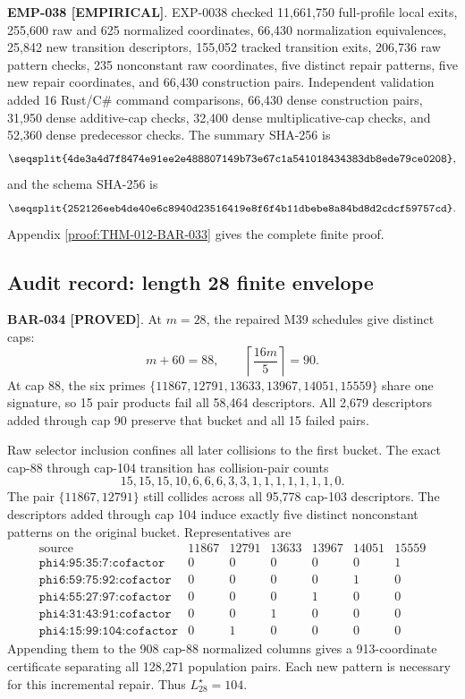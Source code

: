 \documentclass[11pt]{article}
\newcommand{\claimstatus}[2]{\textbf{#1 [#2]}}
\begin{document}
\claimstatus{EMP-038}{EMPIRICAL}. EXP-0038 checked 11,661,750 full-profile
local exits, 255,600 raw and 625 normalized coordinates, 66,430
normalization equivalences, 25,842 new transition descriptors, 155,052
tracked transition exits, 206,736 raw pattern checks, 235 nonconstant raw
coordinates, five distinct repair patterns, five new repair coordinates,
and 66,430 construction pairs. Independent validation added 16 Rust/C\#
command comparisons, 66,430 dense construction pairs, 31,950 dense
additive-cap checks, 32,400 dense multiplicative-cap checks, and 52,360
dense predecessor checks. The summary SHA-256 is
\[
\texttt{\seqsplit{4de3a4d7f8474e91ee2e488807149b73e67c1a541018434383db8ede79ce0208}},
\]
and the schema SHA-256 is
\[
\texttt{\seqsplit{252126eeb4de40e6c8940d23516419e8f6f4b11dbebe8a84bd8d2cdcf59757cd}}.
\]
Appendix \ref{proof:THM-012-BAR-033} gives the complete finite proof.

\subsection{Audit record: length 28 finite envelope}

\claimstatus{BAR-034}{PROVED}. At \(m=28\), the repaired M39 schedules give
distinct caps:
\[
m+60=88,\qquad
\left\lceil\frac{16m}{5}\right\rceil=90.
\]
At cap 88, the six primes
\(\{11867,12791,13633,13967,14051,15559\}\) share one signature, so 15
pair products fail all 58,464 descriptors. All 2,679 descriptors added
through cap 90 preserve that bucket and all 15 failed pairs.

Raw selector inclusion confines all later collisions to the first bucket.
The exact cap-88 through cap-104 transition has collision-pair counts
\[
15,15,15,10,6,6,6,3,3,1,1,1,1,1,1,1,0.
\]
The pair \(\{11867,12791\}\) still collides across all 95,778 cap-103
descriptors. The descriptors added through cap 104 induce exactly five
distinct nonconstant patterns on the original bucket. Representatives are
\[
\begin{array}{c|rrrrrr}
\text{source}&11867&12791&13633&13967&14051&15559\\
\hline
\texttt{phi4:95:35:7:cofactor}&0&0&0&0&0&1\\
\texttt{phi6:59:75:92:cofactor}&0&0&0&0&1&0\\
\texttt{phi4:55:27:97:cofactor}&0&0&0&1&0&0\\
\texttt{phi4:31:43:91:cofactor}&0&0&1&0&0&0\\
\texttt{phi4:15:99:104:cofactor}&0&1&0&0&0&0
\end{array}
\]
Appending them to the 908 cap-88 normalized columns gives a 913-coordinate
certificate separating all 128,271 population pairs. Each new pattern is
necessary for this incremental repair. Thus \(L_{28}^\star=104\).
\end{document}
